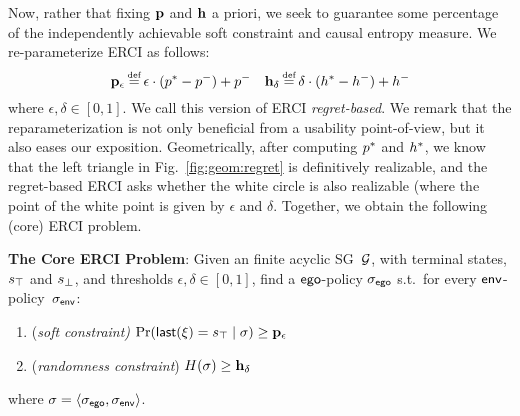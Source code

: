 Now, rather that fixing $\mathbf{p}$ and $\mathbf{h}$ a
  priori, we seek to guarantee some percentage of the independently achievable soft
  constraint and causal entropy measure.
 We
  re-parameterize ERCI as follows:
  \begin{equation}
    \scthreshold_\epsilon \eqdef \epsilon \cdot (\scopt - \scmin) + \scmin
    \hspace{1em}
    \randomness_\delta \eqdef  \delta \cdot (\rndopt - \rndmin) + \rndmin
  \end{equation}
  where $\epsilon, \delta \in [0, 1]$. We call this version of ERCI \emph{regret-based}. We remark that the reparameterization is not only beneficial from a usability point-of-view, but it also eases our exposition.  Geometrically, after computing $p^{*}$ and $h^{*}$, we know that the left triangle in Fig.~\ref{fig:geom:regret} is definitively realizable, and the regret-based ERCI asks whether the white circle is also realizable (where the point of the white point is given by $\epsilon$ and $\delta$. %
\noindent 
Together, we obtain the following (core) ERCI problem.
\begin{mdframed}[backgroundcolor=blue!5,nobreak=true]
\textbf{The Core ERCI Problem}:
Given an finite acyclic SG~$\mathcal{G}$, with terminal states, $s_{\top}$ and $s_{\bot}$, and thresholds $\epsilon, \delta \in [0,1]$,  find a $\mathsf{ego}$-policy ${\sigma_{\mathsf{ego}}}$ s.t.~for every $\mathsf{env}$-policy~${\sigma_{\mathsf{env}}}$:
\begin{enumerate}
\item (\emph{soft constraint)}
  $\Pr(\mathsf{last}({\xi}) = s_{\top} \mid \sigma) \geq \mathbf{p}_\epsilon$
\item (\emph{randomness constraint}) $H(\sigma) \geq \mathbf{h}_\delta$
\end{enumerate}
where  $\sigma = \langle {\sigma_{\mathsf{ego}}}, {\sigma_{\mathsf{env}}} \rangle$.
\end{mdframed}


